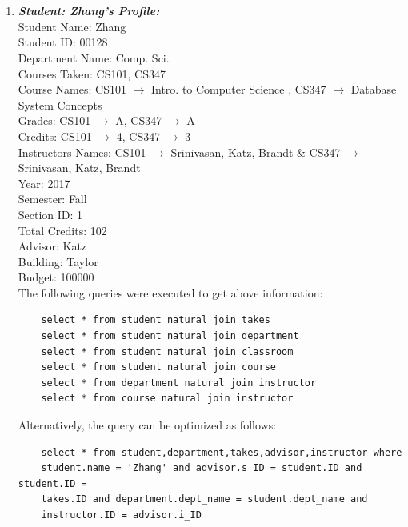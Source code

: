 \documentclass[12pt]{article}
\begin{document}
\maketitle


\section{}

\begin{enumerate}
    \item \textbf{\textit{Student: Zhang's Profile:}} \\
    Student Name: Zhang \\
    Student ID: 00128 \\
    Department Name: Comp. Sci. \\
    Courses Taken: CS101, CS347 \\
    Course Names: CS101 $\rightarrow{}$ Intro. to Computer Science , CS347 $\rightarrow{}$ Database System  Concepts\\
    Grades: CS101 $\rightarrow{}$ A, CS347 $\rightarrow{}$ A- \\
    Credits: CS101 $\rightarrow{}$ 4, CS347 $\rightarrow{}$ 3 \\
    Instructors Names: CS101 $\rightarrow{}$ Srinivasan, Katz, Brandt \& CS347 $\rightarrow{}$ Srinivasan, Katz, Brandt \\
    Year: 2017 \\
    Semester: Fall \\
    Section ID: 1 \\
    Total Credits: 102 \\
    Advisor: Katz \\
    Building: Taylor \\
    Budget: 100000 \\
    
    The following queries were executed to get above information: \\
\begin{verbatim}
    select * from student natural join takes
    select * from student natural join department
    select * from student natural join classroom
    select * from student natural join course
    select * from department natural join instructor
    select * from course natural join instructor
\end{verbatim}


Alternatively, the query can be optimized as follows:
\begin{verbatim}
    select * from student,department,takes,advisor,instructor where
    student.name = 'Zhang' and advisor.s_ID = student.ID and student.ID =
    takes.ID and department.dept_name = student.dept_name and
    instructor.ID = advisor.i_ID
\end{verbatim}


\end{enumerate}
\end{document}
